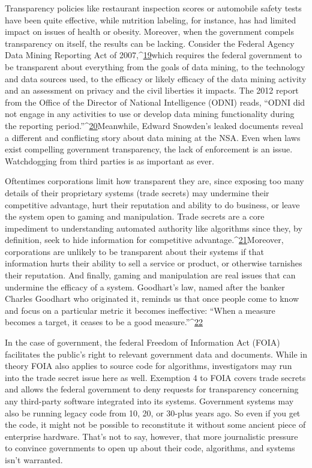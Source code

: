 Transparency policies like restaurant inspection scores or automobile safety tests have been quite effective, while nutrition labeling, for instance, has had limited impact on issues of health or obesity. Moreover, when the government compels transparency on itself, the results can be lacking. Consider the Federal Agency Data Mining Reporting Act of 2007,^{\href{#endnotes}{19}}which requires the federal government to be transparent about everything from the goals of data mining, to the technology and data sources used, to the efficacy or likely efficacy of the data mining activity and an assessment on privacy and the civil liberties it impacts. The 2012 report from the Office of the Director of National Intelligence (ODNI) reads, ``ODNI did not engage in any activities to use or develop data mining functionality during the reporting period.''^{\href{#endnotes}{20}}Meanwhile, Edward Snowden's leaked documents reveal a different and conflicting story about data mining at the NSA. Even when laws exist compelling government transparency, the lack of enforcement is an issue. Watchdogging from third parties is as important as ever. 

Oftentimes corporations limit how transparent they are, since exposing too many details of their proprietary systems (trade secrets) may undermine their competitive advantage, hurt their reputation and ability to do business, or leave the system open to gaming and manipulation. Trade secrets are a core impediment to understanding automated authority like algorithms since they, by definition, seek to hide information for competitive advantage.^{\href{#endnotes}{21}}Moreover, corporations are unlikely to be transparent about their systems if that information hurts their ability to sell a service or product, or otherwise tarnishes their reputation. And finally, gaming and manipulation are real issues that can undermine the efficacy of a system. Goodhart's law, named after the banker Charles Goodhart who originated it, reminds us that once people come to know and focus on a particular metric it becomes ineffective: ``When a measure becomes a target, it ceases to be a good measure.''^{\href{#endnotes}{22}}

In the case of government, the federal Freedom of Information Act (FOIA) facilitates the public's right to relevant government data and documents. While in theory FOIA also applies to source code for algorithms, investigators may run into the trade secret issue here as well. Exemption 4 to FOIA covers trade secrets and allows the federal government to deny requests for transparency concerning any third-party software integrated into its systems. Government systems may also be running legacy code from 10, 20, or 30-plus years ago. So even if you get the code, it might not be possible to reconstitute it without some ancient piece of enterprise hardware. That's not to say, however, that more journalistic pressure to convince governments to open up about their code, algorithms, and systems isn't warranted. 

